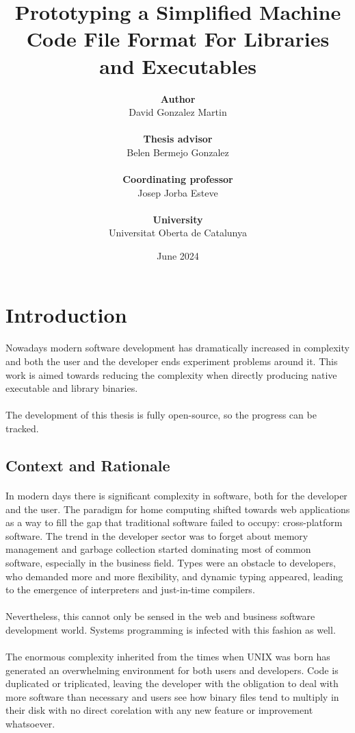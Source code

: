 \documentclass[12pt]{article}
\title{\textbf{Prototyping a Simplified Machine Code File Format For Libraries and Executables}}
\author{\textbf{Author}\\David Gonzalez Martin\\\\\textbf{Thesis advisor}\\Belen Bermejo Gonzalez\\\\\textbf{Coordinating professor}\\Josep Jorba Esteve\\\\\textbf{University}\\Universitat Oberta de Catalunya}
\date{June 2024}
\begin{document}
	\maketitle{}
	\newpage
	\tableofcontents
	\newpage
	\section{Introduction}
	\paragraph{}Nowadays modern software development has dramatically increased in complexity and both the user and the developer ends experiment problems around it. This work is aimed towards reducing the complexity when directly producing native executable and library binaries.
	\paragraph{}The development of this thesis is fully open-source, so the progress can be tracked\cite{self}.
	\subsection{Context and Rationale}
	\paragraph{}In modern days there is significant complexity in software, both for the developer and the user. The paradigm for home computing shifted towards web applications as a way to fill the gap that traditional software failed to occupy: cross-platform software. The trend in the developer sector was to forget about memory management and garbage collection started dominating most of common software, especially in the business field. Types were an obstacle to developers, who demanded more and more flexibility, and dynamic typing appeared, leading to the emergence of interpreters and just-in-time compilers.
	\paragraph{}Nevertheless, this cannot only be sensed in the web and business software development world. Systems programming is infected with this fashion as well.
	\paragraph{} The enormous complexity inherited from the times when UNIX was born has generated an overwhelming environment for both users and developers. Code is duplicated or triplicated, leaving the developer with the obligation to deal with more software than necessary and users see how binary files tend to multiply in their disk with no direct corelation with any new feature or improvement whatsoever.
\end{document}
